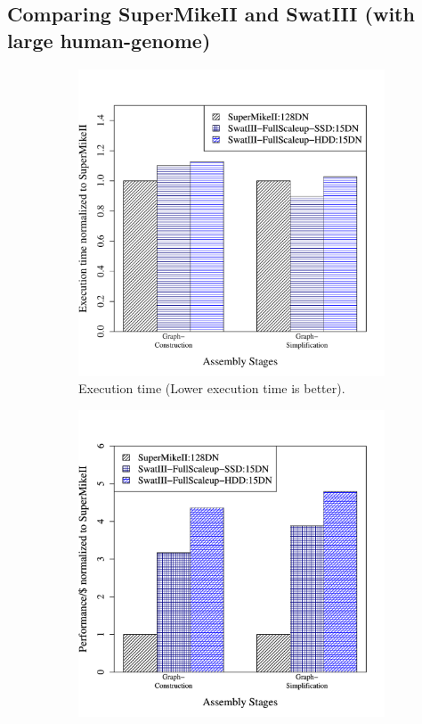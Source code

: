 \documentclass[conference]{IEEEtran}
\begin{document}
\subsection {Comparing SuperMikeII and SwatIII (with large human-genome)} \label{SecPerfDiffArchHum}
\begin{figure}[htb]
        \begin{subfigure}[b]{0.23\textwidth}
                \includegraphics[width=\textwidth]{Figure/PerormanceData/Plots/PerfDiffArchHum.pdf}
                \caption{Execution time (Lower execution time is better).}
                \label{fig:DifferentArchitecturesPerfHum}
        \end{subfigure}
        \begin{subfigure}[b]{0.23\textwidth}
                \includegraphics[width=\textwidth]{Figure/PerormanceData/Plots/PerfPerDollarDiffArchHum.pdf}

\end{subfigure}
\end{figure}
\end{document}
